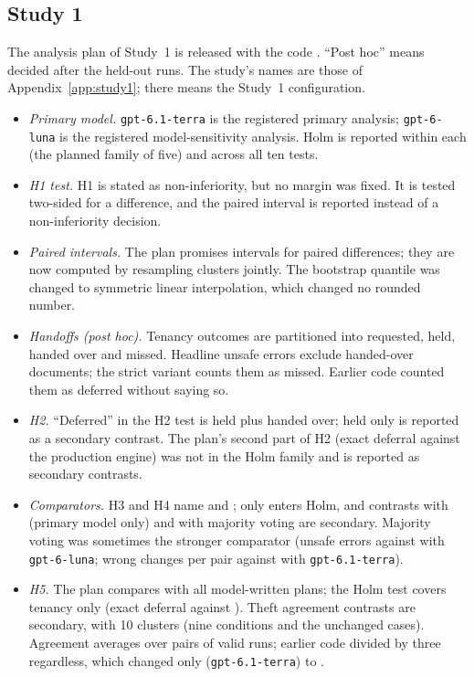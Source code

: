 \subsection{Study 1}
\label{app:dev-study1}

The analysis plan of Study~1 is released with the code \cite{casepath2026repo}. ``Post hoc'' means decided after the held-out runs. The study's names are those of Appendix~\ref{app:study1}; \casepath there means the Study~1 configuration.
\begin{itemize}[leftmargin=1.2em,itemsep=1pt]
\item \emph{Primary model.} \texttt{gpt-6.1-terra} is the registered primary analysis; \texttt{gpt-6-luna} is the registered model-sensitivity analysis. Holm is reported within each (the planned family of five) and across all ten tests.
\item \emph{H1 test.} H1 is stated as non-inferiority, but no margin was fixed. It is tested two-sided for a difference, and the paired interval is reported instead of a non-inferiority decision.
\item \emph{Paired intervals.} The plan promises intervals for paired differences; they are now computed by resampling clusters jointly. The bootstrap quantile was changed to symmetric linear interpolation, which changed no rounded number.
\item \emph{Handoffs (post hoc).} Tenancy outcomes are partitioned into requested, held, handed over and missed. Headline unsafe errors exclude handed-over documents; the strict variant counts them as missed. Earlier code counted them as deferred without saying so.
\item \emph{H2.} ``Deferred'' in the H2 test is held plus handed over; held only is reported as a secondary contrast. The plan's second part of H2 (exact deferral against the production engine) was not in the Holm family and is reported as secondary contrasts.
\item \emph{Comparators.} H3 and H4 name  and ; only  enters Holm, and contrasts with  (primary model only) and with majority voting are secondary. Majority voting was sometimes the stronger comparator (unsafe errors \tenLunaBscUnsafe{} against \tenLunaBoneUnsafe{} with \texttt{gpt-6-luna}; wrong changes per pair \thTerraRscWrongPP{} against \thTerraRWrongPP{} with \texttt{gpt-6.1-terra}).
\item \emph{H5.} The plan compares \casepath with all model-written plans; the Holm test covers tenancy only (exact deferral against ). Theft agreement contrasts are secondary, with 10 clusters (nine conditions and the unchanged cases). Agreement averages over pairs of valid runs; earlier code divided by three regardless, which changed only  (\texttt{gpt-6.1-terra}) to \thTerraDRetest.

\end{itemize}
